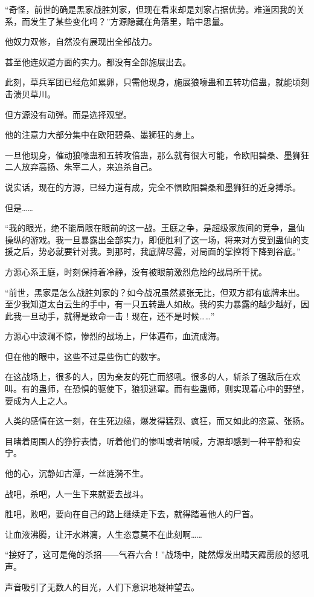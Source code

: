 \begin{this_body}
“奇怪，前世的确是黑家战胜刘家，但现在看来却是刘家占据优势。难道因我的关系，而发生了某些变化吗？”方源隐藏在角落里，暗中思量。

他奴力双修，自然没有展现出全部战力。

甚至他连奴道方面的实力。都没有全部施展出去。

此刻，草兵军团已经危如累卵，只需他现身，施展狼嚎蛊和五转功倍蛊，就能顷刻击溃贝草川。

但方源没有动弹。而是选择观望。

他的注意力大部分集中在欧阳碧桑、墨狮狂的身上。

一旦他现身，催动狼嚎蛊和五转攻倍蛊，那么就有很大可能，令欧阳碧桑、墨狮狂二人放弃高扬、朱宰二人，来追杀自己。

说实话，现在的方源，已经力道有成，完全不惧欧阳碧桑和墨狮狂的近身搏杀。

但是……

“我的眼光，绝不能局限在眼前的这一战。王庭之争，是超级家族间的竞争，蛊仙操纵的游戏。我一旦暴露出全部实力，即便胜利了这一场，将来对方受到蛊仙的支援之后，势必就要针对我。到那时，我底牌尽露，对局面的掌控将下降到谷底。”

方源心系王庭，时刻保持着冷静，没有被眼前激烈危险的战局所干扰。

“前世，黑家是怎么战胜刘家的？如今战况虽然紧张无比，但双方都有底牌未出。至少我知道太白云生的手中，有一只五转蛊人如故。我的实力暴露的越少越好，因此我一旦动手，就得是致命一击！现在，还不是时候……”

方源心中波澜不惊，惨烈的战场上，尸体遍布，血流成海。

但在他的眼中，这些不过是些伤亡的数字。

在这战场上，很多的人，因为亲友的死亡而怒吼。很多的人，斩杀了强敌后在欢叫。有的蛊师，在恐惧的驱使下，狼狈逃窜。而有些蛊师，则实现着心中的野望，要成为人上之人。

人类的感情在这一刻，在生死边缘，爆发得猛烈、疯狂，而又如此的恣意、张扬。

目睹着周围人的狰狞表情，听着他们的惨叫或者呐喊，方源却感到一种平静和安宁。

他的心，沉静如古潭，一丝涟漪不生。

战吧，杀吧，人一生下来就要去战斗。

胜吧，败吧，要向在自己的路上继续走下去，就得踏着他人的尸首。

让血液沸腾，让汗水淋漓，人生恣意莫不在此刻啊……

“接好了，这可是俺的杀招——气吞六合！”战场中，陡然爆发出晴天霹雳般的怒吼声。

声音吸引了无数人的目光，人们下意识地凝神望去。


\end{this_body}
